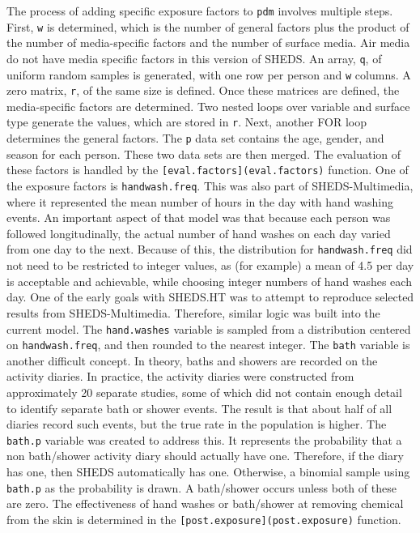 \documentclass[
]{article}
\begin{document}
The process of adding specific exposure factors to \texttt{pdm} involves
multiple steps. First, \texttt{w} is determined, which is the number of
general factors plus the product of the number of media-specific factors
and the number of surface media. Air media do not have media specific
factors in this version of SHEDS. An array, \texttt{q}, of uniform
random samples is generated, with one row per person and \texttt{w}
columns. A zero matrix, \texttt{r}, of the same size is defined. Once
these matrices are defined, the media-specific factors are determined.
Two nested loops over variable and surface type generate the values,
which are stored in \texttt{r}. Next, another FOR loop determines the
general factors. The \texttt{p} data set contains the age, gender, and
season for each person. These two data sets are then merged. The
evaluation of these factors is handled by the
\texttt{{[}eval.factors{]}(eval.factors)} function. One of the exposure
factors is \texttt{handwash.freq}. This was also part of
SHEDS-Multimedia, where it represented the mean number of hours in the
day with hand washing events. An important aspect of that model was that
because each person was followed longitudinally, the actual number of
hand washes on each day varied from one day to the next. Because of
this, the distribution for \texttt{handwash.freq} did not need to be
restricted to integer values, as (for example) a mean of 4.5 per day is
acceptable and achievable, while choosing integer numbers of hand washes
each day. One of the early goals with SHEDS.HT was to attempt to
reproduce selected results from SHEDS-Multimedia. Therefore, similar
logic was built into the current model. The \texttt{hand.washes}
variable is sampled from a distribution centered on
\texttt{handwash.freq}, and then rounded to the nearest integer. The
\texttt{bath} variable is another difficult concept. In theory, baths
and showers are recorded on the activity diaries. In practice, the
activity diaries were constructed from approximately 20 separate
studies, some of which did not contain enough detail to identify
separate bath or shower events. The result is that about half of all
diaries record such events, but the true rate in the population is
higher. The \texttt{bath.p} variable was created to address this. It
represents the probability that a non bath/shower activity diary should
actually have one. Therefore, if the diary has one, then SHEDS
automatically has one. Otherwise, a binomial sample using
\texttt{bath.p} as the probability is drawn. A bath/shower occurs unless
both of these are zero. The effectiveness of hand washes or bath/shower
at removing chemical from the skin is determined in the
\texttt{{[}post.exposure{]}(post.exposure)} function.
\end{document}
